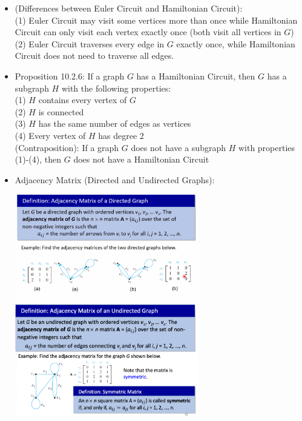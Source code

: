 \documentclass{article}
\begin{document}
\begin{itemize}
    \item (Differences between Euler Circuit and Hamiltonian Circuit):
        \\ \hspace*{3mm} (1) Euler Circuit may visit some vertices more than once while Hamiltonian Circuit can only visit each vertex \hspace*{8.7mm} exactly once (both visit all vertices in $G$)
        \\ \hspace*{3mm} (2) Euler Circuit traverses every edge in $G$ exactly once, while Hamiltonian Circuit does not need to traverse \hspace*{8.7mm} all edges.
    \item Proposition 10.2.6: If a graph $G$ has a Hamiltonian Circuit, then $G$ has a subgraph $H$ with the following properties:
        \\ \hspace*{3mm} (1) $H$ contains every vertex of $G$
        \\ \hspace*{3mm} (2) $H$ is connected
        \\ \hspace*{3mm} (3) $H$ has the same number of edges as vertices
        \\ \hspace*{3mm} (4) Every vertex of $H$ has degree 2
        \\ (Contraposition): If a graph $G$ does not have a subgraph $H$ with properties (1)-(4), then $G$ does not have a \hspace*{27.5mm}  Hamiltonian Circuit
    \item Adjacency Matrix (Directed and Undirected Graphs):
        \begin{center}
            \includegraphics[width=8cm]{adjacencymatrixdirectedgraph.png}
            \includegraphics[width=8cm]{adjacencymatrixundirectedgraph.png}

\end{center}
\end{itemize}
\end{document}
